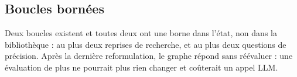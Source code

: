 \subsection{Boucles bornées}
Deux boucles existent et toutes deux ont une borne dans l'état, non dans la bibliothèque : au plus deux reprises de
recherche, et au plus deux questions de précision. Après la dernière reformulation, le graphe répond sans réévaluer :
une évaluation de plus ne pourrait plus rien changer et coûterait un appel LLM.
